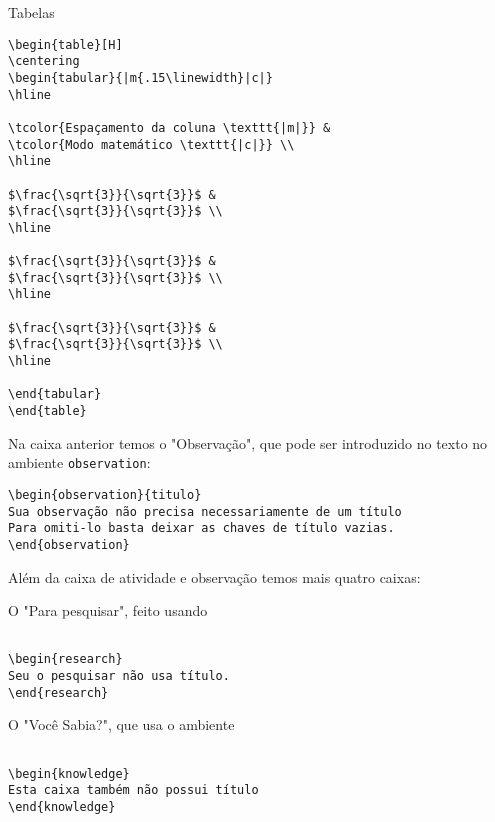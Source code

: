 \begin{task}{Tabelas}
\begin{verbatim}
\begin{table}[H]
\centering
\begin{tabular}{|m{.15\linewidth}|c|}
\hline

\tcolor{Espaçamento da coluna \texttt{|m|}} & 
\tcolor{Modo matemático \texttt{|c|}} \\
\hline

$\frac{\sqrt{3}}{\sqrt{3}}$ & 
$\frac{\sqrt{3}}{\sqrt{3}}$ \\
\hline

$\frac{\sqrt{3}}{\sqrt{3}}$ & 
$\frac{\sqrt{3}}{\sqrt{3}}$ \\
\hline

$\frac{\sqrt{3}}{\sqrt{3}}$ & 
$\frac{\sqrt{3}}{\sqrt{3}}$ \\
\hline

\end{tabular}
\end{table}
\end{verbatim}

\end{task}



Na caixa anterior temos o "Observação", que pode ser introduzido no texto no ambiente \verb|observation|:
\begin{verbatim}
\begin{observation}{titulo}
Sua observação não precisa necessariamente de um título
Para omiti-lo basta deixar as chaves de título vazias.
\end{observation}
\end{verbatim}

Além da caixa de atividade e observação temos mais quatro caixas:

\begin{research}
O "Para pesquisar", feito usando

\begin{verbatim}

\begin{research}
Seu o pesquisar não usa título.
\end{research}
\end{verbatim}
\end{research}

\begin{knowledge}
O "Você Sabia?", que usa o ambiente

\begin{verbatim}

\begin{knowledge}
Esta caixa também não possui título
\end{knowledge}
\end{verbatim}
\end{knowledge}


